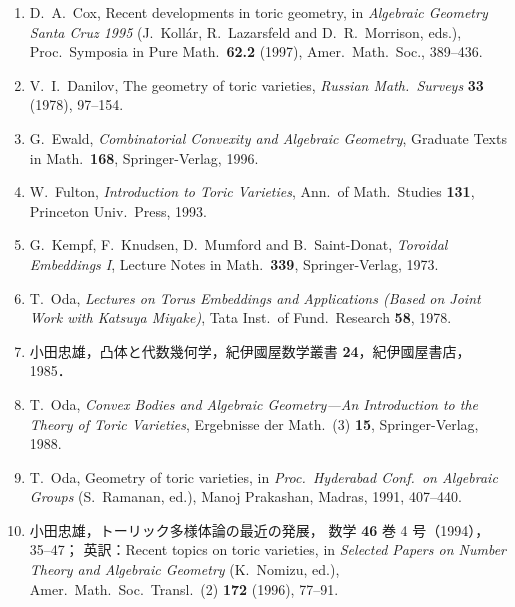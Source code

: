 \documentclass[uplatex,dvipdfmx]{jlreq}
\begin{document}
\begin{enumerate}
  \setlength{\itemsep}{3pt}

  \item D.~A.~Cox,
        Recent developments in toric geometry,
        in \textit{Algebraic Geometry Santa Cruz 1995}
        (J.~Koll\'ar, R.~Lazarsfeld and D.~R.~Morrison, eds.),
        Proc.\ Symposia in Pure Math.\ \textbf{62.2} (1997),
        Amer.\ Math.\ Soc., 389--436.

  \item V.~I.~Danilov,
        The geometry of toric varieties,
        \textit{Russian Math.\ Surveys} \textbf{33} (1978), 97--154.

  \item G.~Ewald,
        \textit{Combinatorial Convexity and Algebraic Geometry},
        Graduate Texts in Math.\ \textbf{168}, Springer-Verlag, 1996.

  \item W.~Fulton,
        \textit{Introduction to Toric Varieties},
        Ann.\ of Math.\ Studies \textbf{131}, Princeton Univ.\ Press, 1993.

  \item G.~Kempf, F.~Knudsen, D.~Mumford and B.~Saint-Donat,
        \textit{Toroidal Embeddings I},
        Lecture Notes in Math.\ \textbf{339}, Springer-Verlag, 1973.

  \item T.~Oda,
        \textit{Lectures on Torus Embeddings and Applications
        (Based on Joint Work with Katsuya Miyake)},
        Tata Inst.\ of Fund.\ Research \textbf{58}, 1978.

  \item 小田忠雄，凸体と代数幾何学，紀伊國屋数学叢書 \textbf{24}，紀伊國屋書店，1985．

  \item T.~Oda,
        \textit{Convex Bodies and Algebraic Geometry---An Introduction
        to the Theory of Toric Varieties},
        Ergebnisse der Math.\ (3) \textbf{15}, Springer-Verlag, 1988.

  \item T.~Oda,
        Geometry of toric varieties,
        in \textit{Proc.\ Hyderabad Conf.\ on Algebraic Groups}
        (S.~Ramanan, ed.), Manoj Prakashan, Madras, 1991, 407--440.

  \item 小田忠雄，トーリック多様体論の最近の発展，
        数学 \textbf{46} 巻 4 号（1994），35--47；
        英訳：Recent topics on toric varieties,
        in \textit{Selected Papers on Number Theory and Algebraic Geometry}
        (K.~Nomizu, ed.),
        Amer.\ Math.\ Soc.\ Transl.\ (2) \textbf{172} (1996), 77--91.

\end{enumerate}
\end{document}

